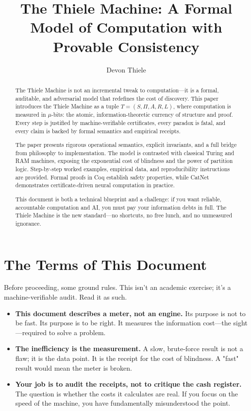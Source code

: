 \documentclass[11pt]{article}
\title{The Thiele Machine: A Formal Model of Computation with Provable Consistency}
\author{Devon Thiele}
\date{}
\begin{document}
\maketitle

\begin{abstract}
The Thiele Machine is not an incremental tweak to computation—it is a formal, auditable, and adversarial model that redefines the cost of discovery. This paper introduces the Thiele Machine as a tuple $T = (S, \Pi, A, R, L)$, where computation is measured in $\mu$-bits: the atomic, information-theoretic currency of structure and proof. Every step is justified by machine-verifiable certificates, every paradox is fatal, and every claim is backed by formal semantics and empirical receipts.

The paper presents rigorous operational semantics, explicit invariants, and a full bridge from philosophy to implementation. The model is contrasted with classical Turing and RAM machines, exposing the exponential cost of blindness and the power of partition logic. Step-by-step worked examples, empirical data, and reproducibility instructions are provided. Formal proofs in Coq establish safety properties, while CatNet demonstrates certificate-driven neural computation in practice.

This document is both a technical blueprint and a challenge: if you want reliable, accountable computation and AI, you must pay your information debts in full. The Thiele Machine is the new standard—no shortcuts, no free lunch, and no unmeasured ignorance.
\end{abstract}

\section*{The Terms of This Document}
Before proceeding, some ground rules. This isn't an academic exercise; it's a machine-verifiable audit. Read it as such.

\begin{itemize}
  \item \textbf{This document describes a meter, not an engine.} Its purpose is not to be fast. Its purpose is to be right. It measures the information cost—the sight—required to solve a problem.
  \item \textbf{The inefficiency is the measurement.} A slow, brute-force result is not a flaw; it is the data point. It is the receipt for the cost of blindness. A "fast" result would mean the meter is broken.
  \item \textbf{Your job is to audit the receipts, not to critique the cash register.} The question is whether the costs it calculates are real. If you focus on the speed of the machine, you have fundamentally misunderstood the point.
\end{itemize}
\end{document}
